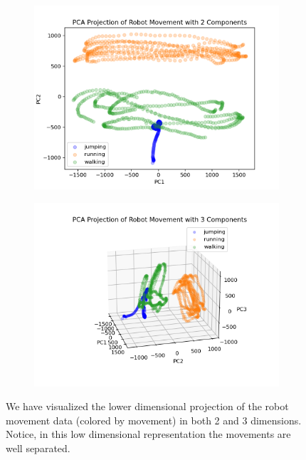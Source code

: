 \documentclass[11pt]{amsart}
\begin{document}
\begin{figure}[h]
    \centering
    \begin{subfigure}{0.4\textwidth}
        \centering
        \includegraphics[width=\textwidth]{../visualizations/pca_2_components_plot.png}
        \label{fig:image1}
    \end{subfigure}
    \begin{subfigure}{0.49\textwidth}
        \centering
        \includegraphics[width=\textwidth]{../visualizations/pca_3_components_plot.png}
        \label{fig:image2}
    \end{subfigure}
    \caption{We have visualized the lower dimensional projection of the robot movement data (colored by movement) in both 2 and 3 dimensions.
    Notice, in this low dimensional representation the movements are well separated. }
    \label{fig:f1}
\end{figure}
\end{document}

